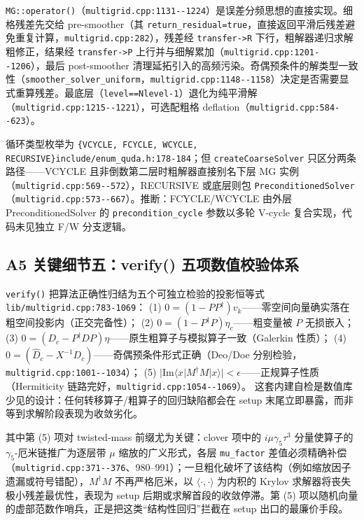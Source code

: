 \documentclass[UTF8]{ctexart}
\begin{document}
\texttt{MG::operator()}（\textcolor{evidence}{\texttt{\nolinkurl{multigrid.cpp:1131--1224}}}）是误差分频思想的直接实现。细格残差先交给 pre-smoother（其 \texttt{return\_residual=true}，直接返回平滑后残差避免重复计算，\textcolor{evidence}{\texttt{\nolinkurl{multigrid.cpp:282}}}），残差经 \texttt{transfer->R} 下行，粗解器递归求解粗修正，结果经 \texttt{transfer->P} 上行并与细解累加（\textcolor{evidence}{\texttt{\nolinkurl{multigrid.cpp:1201--1206}}}），最后 post-smoother 清理延拓引入的高频污染。奇偶预条件的解类型一致性（\texttt{smoother\_solver\_uniform}，\textcolor{evidence}{\texttt{\nolinkurl{multigrid.cpp:1148--1158}}}）决定是否需要显式重算残差。最底层（\texttt{level==Nlevel-1}）退化为纯平滑解（\textcolor{evidence}{\texttt{\nolinkurl{multigrid.cpp:1215--1221}}}），可选配粗格 deflation（\textcolor{evidence}{\texttt{\nolinkurl{multigrid.cpp:584--623}}}）。

循环类型枚举为 \texttt{\{VCYCLE, FCYCLE, WCYCLE, RECURSIVE\}}\textcolor{evidence}{\texttt{\nolinkurl{include/enum_quda.h:178-184}}}；但 \texttt{createCoarseSolver} 只区分两条路径——VCYCLE 且非倒数第二层时粗解器直接别名下层 MG 实例（\textcolor{evidence}{\texttt{\nolinkurl{multigrid.cpp:569--572}}}），RECURSIVE 或底层则包 \texttt{PreconditionedSolver}（\textcolor{evidence}{\texttt{\nolinkurl{multigrid.cpp:573--667}}}）。\textcolor{relation}{推断}：FCYCLE/WCYCLE 由外层 PreconditionedSolver 的 \texttt{precondition\_cycle} 参数以多轮 V-cycle 复合实现，代码未见独立 F/W 分支逻辑。

\subsection{A5 关键细节五：verify() 五项数值校验体系}

\texttt{verify()} 把算法正确性归结为五个可独立检验的投影恒等式\textcolor{evidence}{\texttt{\nolinkurl{lib/multigrid.cpp:783-1069}}}：
(1) $0=(1-PP^\dagger)v_k$——零空间向量确实落在粗空间投影内（正交完备性）；
(2) $0=(1-P^\dagger P)\eta_c$——粗变量被 $P$ 无损嵌入；
(3) $0=(D_c-P^\dagger DP)\eta$——原生粗算子与模拟算子一致（Galerkin 性质）；
(4) $0=(\hat D_c-X^{-1}D_c)$——奇偶预条件形式正确（Deo/Doe 分别检验，\textcolor{evidence}{\texttt{\nolinkurl{multigrid.cpp:1001--1034}}}）；
(5) $|\mathrm{Im}\langle x|M^\dagger M|x\rangle|<\epsilon$——正规算子性质（Hermiticity 链路完好，\textcolor{evidence}{\texttt{\nolinkurl{multigrid.cpp:1054--1069}}}）。
这套内建自检是数值库少见的设计：任何转移算子/粗算子的回归缺陷都会在 setup 末尾立即暴露，而非等到求解阶段表现为收敛劣化。

其中第 (5) 项对 twisted-mass 前缀尤为关键：clover 项中的 $i\mu\gamma_5\tau^3$ 分量使算子的 $\gamma_5$-厄米链推广为逐层带 $\mu$ 缩放的广义形式，各层 \texttt{mu\_factor} 差值必须精确补偿（\textcolor{evidence}{\texttt{\nolinkurl{multigrid.cpp:371--376}}}、980--991）；一旦粗化破坏了该结构（例如缩放因子遗漏或符号错配），$M^{\dagger}M$ 不再严格厄米，以 $\langle\cdot,\cdot\rangle$ 为内积的 Krylov 求解器将丧失极小残差最优性，表现为 setup 后期或求解首段的收敛停滞。第 (5) 项以随机向量的虚部范数作哨兵，正是把这类``结构性回归''拦截在 setup 出口的最廉价手段。
\end{document}
